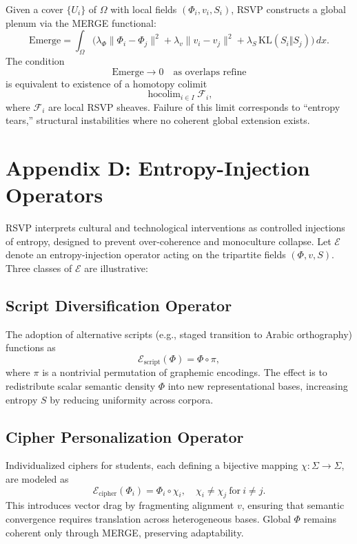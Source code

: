 \documentclass[12pt]{article}
\begin{document}
Given a cover $\{U_i\}$ of $\Omega$ with local fields $(\Phi_i, v_i, S_i)$, RSVP constructs a global plenum via the MERGE functional:
\[
\mathrm{Emerge} = \int_\Omega \Big(\lambda_\Phi \|\Phi_i - \Phi_j\|^2 + \lambda_v \|v_i - v_j\|^2 + \lambda_S\,\mathrm{KL}(S_i\Vert S_j)\Big)\,dx.
\]
The condition
\[
\mathrm{Emerge} \to 0 \quad \text{as overlaps refine}
\]
is equivalent to existence of a homotopy colimit
\[
\operatorname{hocolim}_{i\in I} \mathcal{F}_i,
\]
where $\mathcal{F}_i$ are local RSVP sheaves. Failure of this limit corresponds to “entropy tears,” structural instabilities where no coherent global extension exists.

\section*{Appendix D: Entropy-Injection Operators}

RSVP interprets cultural and technological interventions as controlled injections of entropy, designed to prevent over-coherence and monoculture collapse. Let $\mathcal{E}$ denote an entropy-injection operator acting on the tripartite fields $(\Phi,v,S)$. Three classes of $\mathcal{E}$ are illustrative:

\subsection*{Script Diversification Operator}
The adoption of alternative scripts (e.g., staged transition to Arabic orthography) functions as
\[
\mathcal{E}_{\text{script}}(\Phi) = \Phi \circ \pi,
\]
where $\pi$ is a nontrivial permutation of graphemic encodings. The effect is to redistribute scalar semantic density $\Phi$ into new representational bases, increasing entropy $S$ by reducing uniformity across corpora.

\subsection*{Cipher Personalization Operator}
Individualized ciphers for students, each defining a bijective mapping $\chi: \Sigma \to \Sigma$, are modeled as
\[
\mathcal{E}_{\text{cipher}}(\Phi_i) = \Phi_i \circ \chi_i, \quad \chi_i \neq \chi_j \ \text{for} \ i \neq j.
\]
This introduces vector drag by fragmenting alignment $v$, ensuring that semantic convergence requires translation across heterogeneous bases. Global $\Phi$ remains coherent only through MERGE, preserving adaptability.
\end{document}
